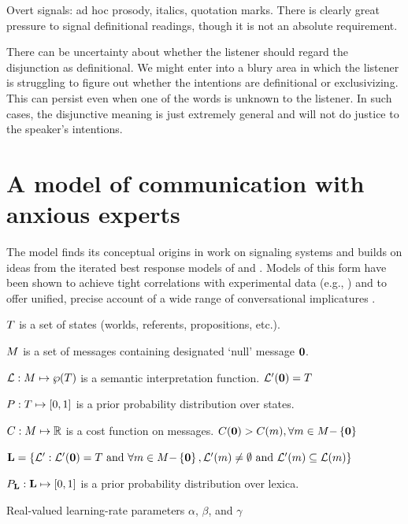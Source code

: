 \documentclass{article}
\begin{document}
Overt signals: ad hoc prosody, italics, quotation marks. There is
clearly great pressure to signal definitional readings, though it is
not an absolute requirement.


There can be uncertainty about whether the listener should regard the
disjunction as definitional. We might enter into a blury area in which
the listener is struggling to figure out whether the intentions are
definitional or exclusivizing. This can persist even when one of the
words is unknown to the listener. In such cases, the disjunctive
meaning is just extremely general and will not do justice to the
speaker's intentions.



\section{A model of communication with anxious experts}\label{sec:model}

The model finds its conceptual origins in  work on
signaling systems and builds on ideas from the iterated best response
models of \citet{Jaeger:2007,Jaeger:2011} and
\citet{Franke09DISS}. Models of this form have been shown to achieve
tight correlations with experimental data (e.g.,
\citealt{Frank:Goodman:2012}) and to offer unified, precise account of
a wide range of conversational implicatures
\citep{bergen-levy-goodman:2014}.

\begin{examples}
\item\label{model}
  \begin{examples}
  \item\label{states}%
    $T$ is a set of states (worlds, referents, propositions, etc.).
  \item\label{messages}%
    $M$ is a set of messages containing designated `null' message $\mathbf{0}$.
  \item\label{lex}%
    $\mathcal{L}: M \mapsto \wp(T)$ is a semantic interpretation function. 
    $\mathcal{L}'(\mathbf{0}) = T$
  \item\label{prior}%
    $P : T \mapsto [0,1]$ is a prior probability
    distribution over states.    
  \item\label{costs}%
    $C : M \mapsto \mathbb{R}$ is a cost function on messages.
    $C(\mathbf{0}) > C(m), {\forall m \in M{-}\left\{ \mathbf{0} \right\}}$
  \item\label{lexset}%
      $\mathbf{L} = \left\{ \mathcal{L}' : \mathcal{L}'(\mathbf{0}) = T \text{ and } 
      \forall m \in M{-}\left\{ \mathbf{0} \right\}, 
      \mathcal{L}'(m) \neq \emptyset \text{ and } 
      \mathcal{L}'(m) \subseteq \mathcal{L}(m) \right\}$
  \item\label{LexPrior}%
    $P_{\mathbf{L}} : \mathbf{L} \mapsto [0,1]$ is a prior
    probability distribution over lexica.
  \item\label{temps}%
    Real-valued learning-rate parameters $\alpha$, $\beta$, and
    $\gamma$
  \end{examples}
\end{examples}
\end{document}
